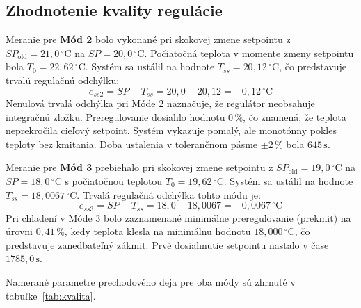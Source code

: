 \subsection{Zhodnotenie kvality regulácie}

Meranie pre \textbf{Mód 2} bolo vykonané pri skokovej zmene setpointu z $SP_\text{old} = 21{,}0\,^\circ\text{C}$ na $SP = 20{,}0\,^\circ\text{C}$. Počiatočná teplota v momente zmeny setpointu bola $T_0 = 22{,}62\,^\circ\text{C}$. Systém sa ustálil na hodnote $T_{ss} = 20{,}12\,^\circ\text{C}$, čo predstavuje trvalú regulačnú odchýlku:
\begin{equation}
    e_{ss2} = SP - T_{ss} = 20{,}0 - 20{,}12 = -0{,}12\,^\circ\text{C}
\end{equation}
Nenulová trvalá odchýlka pri Móde 2 naznačuje, že regulátor neobsahuje integračnú zložku. Preregulovanie dosiahlo hodnotu $0\,\%$, čo znamená, že teplota neprekročila cieľový setpoint. Systém vykazuje pomalý, ale monotónny pokles teploty bez kmitania. Doba ustalenia v tolerančnom pásme $\pm 2\,\%$ bola $645\,\text{s}$.

Meranie pre \textbf{Mód 3} prebiehalo pri skokovej zmene setpointu z $SP_\text{old} = 19{,}0\,^\circ\text{C}$ na $SP = 18{,}0\,^\circ\text{C}$ s počiatočnou teplotou $T_0 = 19{,}62\,^\circ\text{C}$. Systém sa ustálil na hodnote $T_{ss} = 18{,}0067\,^\circ\text{C}$. Trvalá regulačná odchýlka tohto módu je:
\begin{equation}
    e_{ss3} = SP - T_{ss} = 18{,}0 - 18{,}0067 = -0{,}0067\,^\circ\text{C}
\end{equation}
Pri chladení v Móde 3 bolo zaznamenané minimálne preregulovanie (prekmit) na úrovni $0{,}41\,\%$, kedy teplota klesla na minimálnu hodnotu $18{,}000\,^\circ\text{C}$, čo predstavuje zanedbateľný zákmit. Prvé dosiahnutie setpointu nastalo v čase $1785{,}0\,\text{s}$.

Namerané parametre prechodového deja pre oba módy sú zhrnuté v tabuľke~\ref{tab:kvalita}.

